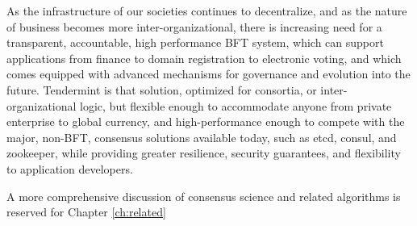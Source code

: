 As the infrastructure of our societies continues to decentralize, and as the nature of business becomes more inter-organizational,
there is increasing need for a transparent, accountable, high performance BFT system, which can support applications from finance to domain registration to electronic voting,
and which comes equipped with advanced mechanisms for governance and evolution into the future.
Tendermint is that solution, optimized for consortia, or inter-organizational logic, but flexible enough to accommodate anyone from private enterprise to global currency,
and high-performance enough to compete with the major, non-BFT, consensus solutions available today, such as etcd, consul, and zookeeper, while providing greater resilience, security guarantees, and flexibility to application developers.

A more comprehensive discussion of consensus science and related algorithms is reserved for Chapter \ref{ch:related}

